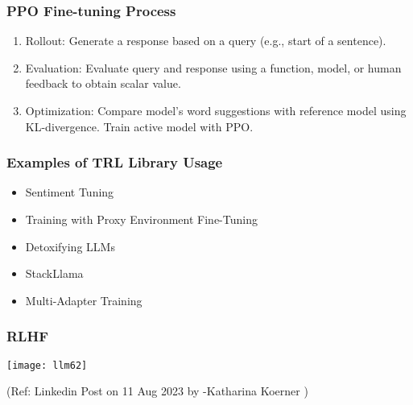 \begin{frame}[fragile]\frametitle{PPO Fine-tuning Process}
\begin{enumerate}
    \item Rollout: Generate a response based on a query (e.g., start of a sentence).
    \item Evaluation: Evaluate query and response using a function, model, or human feedback to obtain scalar value.
    \item Optimization: Compare model's word suggestions with reference model using KL-divergence. Train active model with PPO.
\end{enumerate}
\end{frame}

\begin{frame}[fragile]\frametitle{Examples of TRL Library Usage}
\begin{itemize}
    \item Sentiment Tuning
    \item Training with Proxy Environment Fine-Tuning
    \item Detoxifying LLMs
    \item StackLlama
    \item Multi-Adapter Training
\end{itemize}
\end{frame}

\begin{frame}[fragile]\frametitle{RLHF}

\begin{center}
\texttt{[image: llm62]}
\end{center}		


{\tiny (Ref: Linkedin Post on 11 Aug 2023 by -Katharina Koerner )}

\end{frame}


